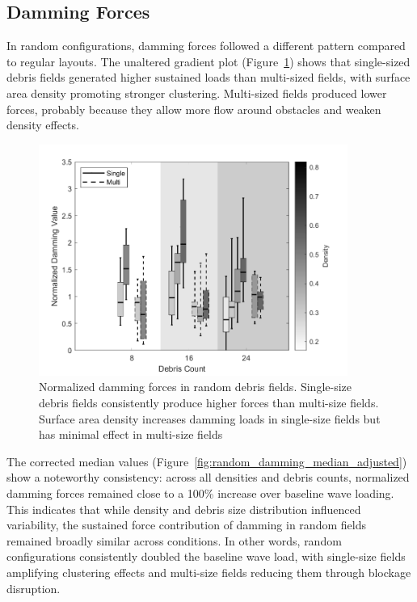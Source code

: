 \documentclass{article}
\begin{document}
\subsection{Damming Forces} 
In random configurations, damming forces followed a different pattern compared to regular layouts. The unaltered gradient plot (Figure~\ref{fig:random_damming_gradient}) shows that single-sized debris fields generated higher sustained loads than multi-sized fields, with surface area density promoting stronger clustering. Multi-sized fields produced lower forces, probably because they allow more flow around obstacles and weaken density effects.

\begin{figure}[htbp]
    \centering
    \includegraphics[width=0.9\textwidth]{Damming_Random_Single_vs_Multi_ByDensityGradient.png}
    \caption{Normalized damming forces in random debris fields. Single-size debris fields consistently produce higher forces than multi-size fields. Surface area density increases damming loads in single-size fields but has minimal effect in multi-size fields}
    \label{fig:random_damming_gradient}
\end{figure}

The corrected median values (Figure~\ref{fig:random_damming_median_adjusted}) show a noteworthy consistency: across all densities and debris counts, normalized damming forces remained close to a 100\% increase over baseline wave loading. This indicates that while density and debris size distribution influenced variability, the sustained force contribution of damming in random fields remained broadly similar across conditions. In other words, random configurations consistently doubled the baseline wave load, with single-size fields amplifying clustering effects and multi-size fields reducing them through blockage disruption.
\end{document}
